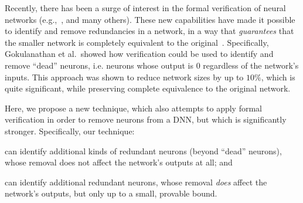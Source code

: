 \documentclass[10pt, conference, twocolumn, compsocconf]{IEEEtran}
\theoremstyle{remark}
\newcommand{\todo}[1]{{\color{red}{\textbf{[TODO]} #1}}}
\begin{document}
Recently, there has been a surge of interest in the formal
verification of neural networks
(e.g.,~\cite{KaBaDiJuKo17,KaBaDiJuKo21,KuKaGoJuBaKo18,HuKwWaWu17,GeMiDrTsChVe18,WaPeWhYaJa18,AmWuBaKa21}, and
many others). These new capabilities have made it possible to identify
and remove redundancies in a network, in a way that \emph{guarantees}
that the smaller network is completely equivalent to the
original~\cite{GoFeMaBaKa20}. Specifically, Gokulanathan et al.~showed
how verification could be used to identify and remove ``dead''
neurons, i.e. neurons whose output is $0$ regardless of the network's
inputs. This approach was shown to reduce network sizes by up to
$10\%$, which is quite significant, while preserving complete
equivalence to the original network.


Here, we propose a new technique, which also attempts to apply formal
verification in order to remove neurons from a DNN, but which is
significantly stronger. Specifically, our technique:
\begin{inparaenum}[(i)]
\item can identify additional kinds of redundant neurons (beyond
  ``dead'' neurons), whose removal does not affect the network's
  outputs at all; and
\item can identify additional redundant neurons, whose removal
  \emph{does} affect the network's outputs, but only up to a small,
  provable bound.
\end{inparaenum}


\end{document}
